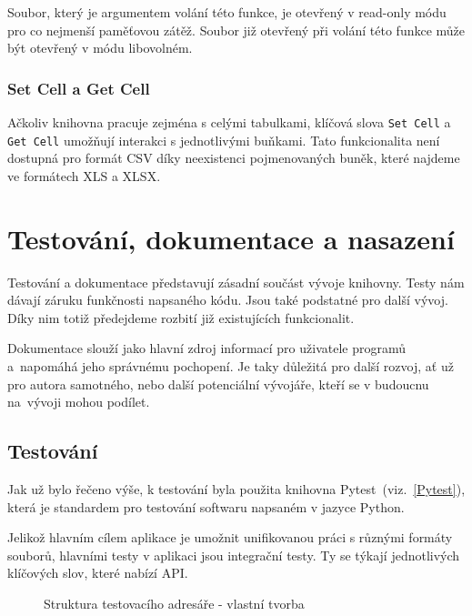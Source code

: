 Soubor, který je argumentem volání této funkce, je otevřený v read-only módu pro co nejmenší paměťovou zátěž. Soubor již otevřený při volání této funkce může být otevřený v módu libovolném.

\subsection{Set Cell a Get Cell}
Ačkoliv knihovna pracuje zejména s celými tabulkami, klíčová slova \texttt{Set Cell} a \texttt{Get Cell} umožňují interakci s jednotlivými buňkami. Tato funkcionalita není dostupná pro formát CSV díky neexistenci pojmenovaných buněk, které najdeme ve formátech XLS a XLSX.

\chapter{Testování, dokumentace a nasazení}

Testování a dokumentace představují zásadní součást vývoje knihovny. Testy nám dávají záruku funkčnosti napsaného kódu. Jsou také podstatné pro další vývoj. Díky nim totiž předejdeme rozbití již existujících funkcionalit.

Dokumentace slouží jako hlavní zdroj informací pro uživatele programů a~napomáhá jeho správnému pochopení. Je taky důležitá pro další rozvoj, ať už pro autora samotného, nebo další potenciální vývojáře, kteří se v budoucnu na~vývoji mohou podílet.

\section{Testování}

Jak už bylo řečeno výše, k testování byla použita knihovna Pytest~(viz.~\ref{Pytest}), která je standardem pro testování softwaru napsaném v jazyce Python.

Jelikož hlavním cílem aplikace je umožnit unifikovanou práci s různými formáty souborů, hlavními testy v aplikaci jsou integrační testy. Ty se týkají jednotlivých klíčových slov, které nabízí API.

\begin{figure}[H]
    \captionsetup{name=Struktura}
    \vspace{1ex} 


    \caption{Struktura testovacího adresáře - vlastní tvorba}
    \label{fig:placeholder}
\end{figure}

